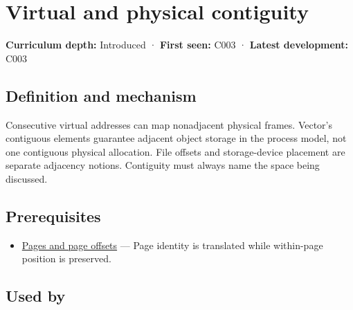 \hypertarget{appendix-f897c1ddac8f}{}\label{referencestart:appendix-f897c1ddac8f}
\section{Virtual and physical contiguity}\label{appendix-f897c1ddac8f-virtual-and-physical-contiguity}

\hypertarget{appendix-f897c1ddac8f-virtual-and-physical-contiguity}{}

\textbf{Curriculum depth:} Introduced · \textbf{First seen:} C003 · \textbf{Latest development:} C003

\begin{allmightroledefinition}

\subsection{Definition and mechanism}\label{appendix-f897c1ddac8f-definition-and-mechanism}

\hypertarget{appendix-f897c1ddac8f-definition-and-mechanism}{}

Consecutive virtual addresses can map nonadjacent physical frames. Vector's contiguous elements guarantee adjacent object storage in the process model, not one contiguous physical allocation. File offsets and storage-device placement are separate adjacency notions. Contiguity must always name the space being discussed.

\end{allmightroledefinition}

\subsection{Prerequisites}\label{appendix-f897c1ddac8f-prerequisites}

\hypertarget{appendix-f897c1ddac8f-prerequisites}{}

\begin{itemize}
\tightlist
\item
  \hyperref[appendix-0c67cd5bf30a]{Pages and page offsets} --- Page identity is translated while within-page position is preserved.
\end{itemize}

\subsection{Used by}\label{appendix-f897c1ddac8f-used-by}

\hypertarget{appendix-f897c1ddac8f-used-by}{}

